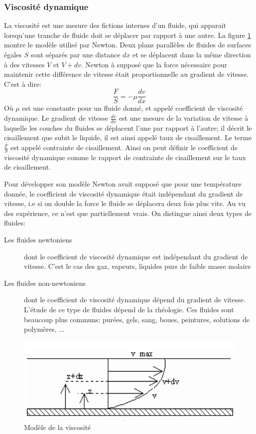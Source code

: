 \documentclass[10pt,a4paper]{article}
\begin{document}
\subsubsection{Viscosité dynamique\cite{viscodyna,viscodyna2,viscodyna3}}
La viscosité est une mesure des fictions internes d'un fluide, qui apparait lorsqu'une tranche de fluide doit se déplacer par rapport à une autre. La figure \ref{fig:viscodyna} montre le modèle utilisé par Newton. Deux plans parallèles de fluides de surfaces égales $S$ sont séparés par une distance $dx$ et se déplacent dans la même direction à des vitesses $V$ et $V+dv$. Newton à supposé que la force nécessaire pour maintenir cette différence de vitesse était proportionnelle au gradient de vitesse. C'est à dire:
\begin{equation}
\frac{F}{S} = -\mu \frac{dv}{dx}
\end{equation}
Où $\mu$ est une constante pour un fluide donné, et appelé coefficient de viscosité dynamique. Le gradient de vitesse $\frac{dv}{dx}$ est une mesure de la variation de vitesse à laquelle les couches du fluides se déplacent l'une par rapport à l'autre; il décrit le cisaillement que subit le liquide, il est ainsi appelé taux de cisaillement. Le terme $\frac{F}{S}$ est appelé contrainte de cisaillement. Ainsi on peut définir le coefficient de viscosité dynamique comme le rapport de contrainte de cisaillement sur le taux de cisaillement.

Pour développer son modèle Newton avait supposé que pour une température donnée, le coefficient de viscosité dynamique était indépendant du gradient de vitesse, i.e si on double la force le fluide se déplacera deux fois plus vite. Au vu des expérience, ce n'est que partiellement vrais. On distingue ainsi deux types de fluides:
\begin{description}
\item[Les fluides newtoniens] dont le coefficient de viscosité dynamique est indépendant du gradient de vitesse. C'est le cas des gaz, vapeurs, liquides purs de faible masse molaire
\item[Les fluides non-newtoniens] dont le coefficient de viscosité dynamique dépend du gradient de vitesse. L'étude de ce type de fluides dépend de la rhéologie. Ces fluides sont beaucoup plus communs: purées, gels, sang, boues, peintures, solutions de polymères, ...
\end{description}

\begin{figure}
\centering
\includegraphics[scale=0.5]{viscodyna}
\caption{Modèle de la viscosité}
\label{fig:viscodyna}
\end{figure}
\end{document}
